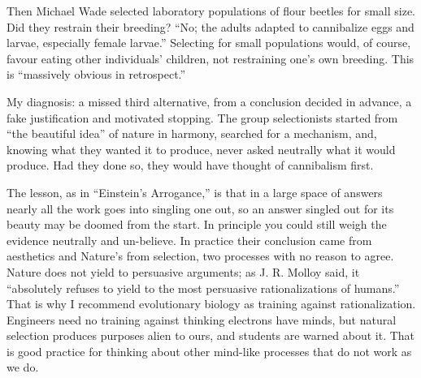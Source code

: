 Then Michael Wade selected laboratory populations of flour beetles for small size. Did they restrain their breeding? ``No; the adults adapted to cannibalize eggs and larvae, especially female larvae.''  Selecting for small populations would, of course, favour eating other individuals' children, not restraining one's own breeding. This is ``massively obvious in retrospect.'' 

My diagnosis: a missed third alternative, from a conclusion decided in advance, a fake justification and motivated stopping. The group selectionists started from ``the beautiful idea'' of nature in harmony, searched for a mechanism, and, knowing what they wanted it to produce, never asked neutrally what it would produce. Had they done so, they would have thought of cannibalism first. 

The lesson, as in ``Einstein's Arrogance,'' is that in a large space of answers nearly all the work goes into singling one out, so an answer singled out for its beauty may be doomed from the start. In principle you could still weigh the evidence neutrally and un-believe. In practice their conclusion came from aesthetics and Nature's from selection, two processes with no reason to agree. Nature does not yield to persuasive arguments; as J. R. Molloy said, it ``absolutely refuses to yield to the most persuasive rationalizations of humans.'' That is why I recommend evolutionary biology as training against rationalization. Engineers need no training against thinking electrons have minds, but natural selection produces purposes alien to ours, and students are warned about it. That is good practice for thinking about other mind-like processes that do not work as we do.
